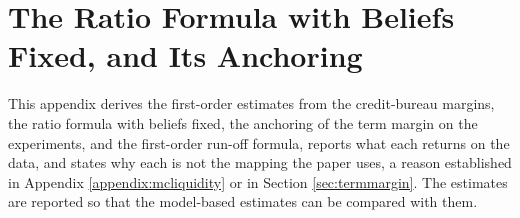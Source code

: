 \section{The Ratio Formula with Beliefs Fixed, and Its Anchoring}\label{appendix:formula}

This appendix derives the first-order estimates from the credit-bureau margins, the ratio formula with beliefs fixed, the anchoring of the term margin on the experiments, and the first-order run-off formula, reports what each returns on the data, and states why each is not the mapping the paper uses, a reason established in Appendix \ref{appendix:mcliquidity} or in Section \ref{sec:termmargin}. The estimates are reported so that the model-based estimates can be compared with them.

